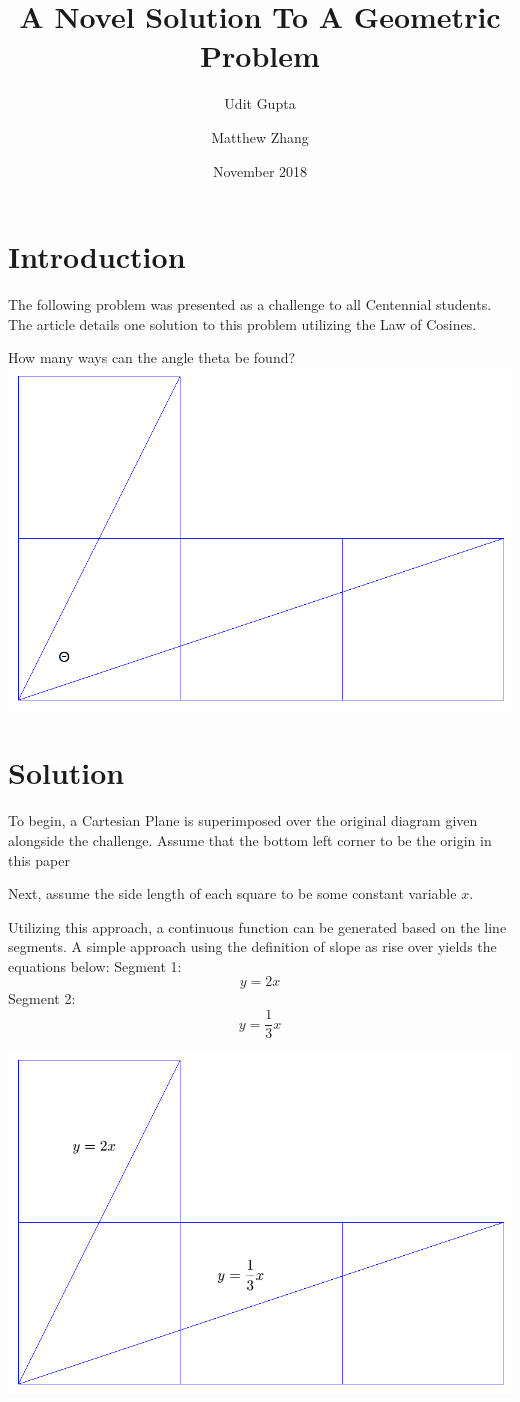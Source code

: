 \documentclass{article}
\title{A Novel Solution To A Geometric Problem}
\author{Udit Gupta \and Matthew Zhang}
\date{November 2018}
\begin{document}
\maketitle


\section*{Introduction}
The following problem was presented as a challenge to all Centennial students. The article details one solution to this problem utilizing the Law of Cosines. 
\begin{center}
	How many ways can the angle theta be found?
	\includegraphics[width=.8\linewidth]{originalTheta.png}
\end{center}

\section*{Solution}
To begin, a Cartesian Plane is superimposed over the original diagram given alongside the challenge. Assume that the bottom left corner to be the origin in this paper

Next, assume the side length of each square to be some constant variable $x$.

\pagebreak

Utilizing this approach, a continuous function can be generated based on the line segments. A simple approach using the definition of slope as rise over yields the equations below:
 Segment 1: $$ y=2x$$
 Segment 2: $$  y=\frac{1}{3}x$$
\begin{center}
	\includegraphics[width=.8\linewidth]{equations.png}
\end{center}
\end{document}
